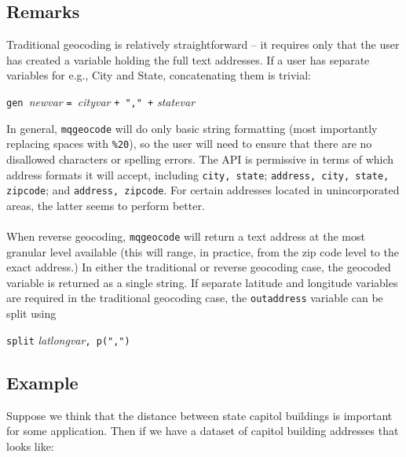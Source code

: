 \documentclass[12pt]{article}
\begin{document}
\subsection{Remarks}
Traditional geocoding is relatively straightforward -- it requires only that the user has created a variable holding the full text addresses. If a user has separate variables for e.g., City and State, concatenating them is trivial:

 \begin{center}\verb|gen |\textit{newvar} \verb|= |\textit{cityvar} \verb|+ "," +| \textit{statevar} \end{center} 
In general, \verb|mqgeocode| will do only basic string formatting (most importantly replacing spaces with \verb|%20|), so the user will need to ensure that there are no disallowed characters or spelling errors. The API is permissive in terms of which address formats it will accept, including \verb|city, state|; \verb|address, city, state, zipcode|; and \verb|address, zipcode|. For certain addresses located in unincorporated areas, the latter seems to perform better. 
\\ \\
When reverse geocoding, \verb|mqgeocode| will return a text address at the most granular level available (this will range, in practice, from the zip code level to the exact address.) In either the traditional or reverse geocoding case, the geocoded variable is returned as a single string. If separate latitude and longitude variables are required in the traditional geocoding case, the \verb|outaddress| variable can be split using

\begin{center}
\verb|split| \textit{latlongvar}\verb|, p(",")|
\end{center}

\subsection{Example}
Suppose we think that the distance between state capitol buildings is important for some application. Then if we have a dataset of capitol building addresses that looks like:
\end{document}
